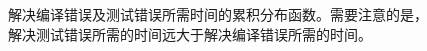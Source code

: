 \begin{figure}
\centering
\begin{tikzpicture}

\end{tikzpicture}
\caption{解决编译错误及测试错误所需时间的累积分布函数。需要注意的是，解决测试错误所需的时间远大于解决编译错误所需的时间。}
\label{fig:re_ce_cdf}
\end{figure}
